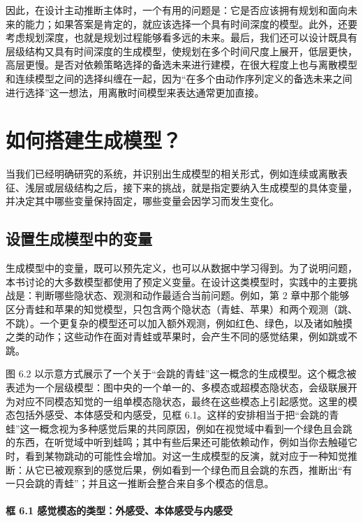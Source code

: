 因此，在设计主动推断主体时，一个有用的问题是：它是否应该拥有规划和面向未来的能力；如果答案是肯定的，就应该选择一个具有时间深度的模型。此外，还要考虑规划深度，也就是规划过程能够看多远的未来。最后，我们还可以设计既具有层级结构又具有时间深度的生成模型，使规划在多个时间尺度上展开，低层更快，高层更慢。是否对依赖策略选择的备选未来进行建模，在很大程度上也与离散模型和连续模型之间的选择纠缠在一起，因为“在多个由动作序列定义的备选未来之间进行选择”这一想法，用离散时间模型来表达通常更加直接。

\section{如何搭建生成模型？}

当我们已经明确研究的系统，并识别出生成模型的相关形式，例如连续或离散表征、浅层或层级结构之后，接下来的挑战，就是指定要纳入生成模型的具体变量，并决定其中哪些变量保持固定，哪些变量会因学习而发生变化。

\subsection{设置生成模型中的变量}

生成模型中的变量，既可以预先定义，也可以从数据中学习得到。为了说明问题，本书讨论的大多数模型都使用了预定义变量。在设计这类模型时，实践中的主要挑战是：判断哪些隐状态、观测和动作最适合当前问题。例如，第 2 章中那个能够区分青蛙和苹果的知觉模型，只包含两个隐状态（青蛙、苹果）和两个观测（跳、不跳）。一个更复杂的模型还可以加入额外观测，例如红色、绿色，以及诸如触摸之类的动作；这些动作在面对青蛙或苹果时，会产生不同的感觉结果，例如跳或不跳。

图 6.2 以示意方式展示了一个关于“会跳的青蛙”这一概念的生成模型。这个概念被表述为一个层级模型：图中央的一个单一的、多模态或超模态隐状态，会级联展开为对应不同模态知觉的一组单模态隐状态，最终在这些模态上引起感觉。这里的模态包括外感受、本体感受和内感受，见框 6.1。这样的安排相当于把“会跳的青蛙”这一概念视为多种感觉后果的共同原因，例如在视觉域中看到一个绿色且会跳的东西，在听觉域中听到蛙鸣；其中有些后果还可能依赖动作，例如当你去触碰它时，看到某物跳动的可能性会增加。对这一生成模型的反演，就对应于一种知觉推断：从它已被观察到的感觉后果，例如看到一个绿色而且会跳的东西，推断出“有一只会跳的青蛙”；并且这一推断会整合来自多个模态的信息。

\paragraph{框 6.1 感觉模态的类型：外感受、本体感受与内感受}

